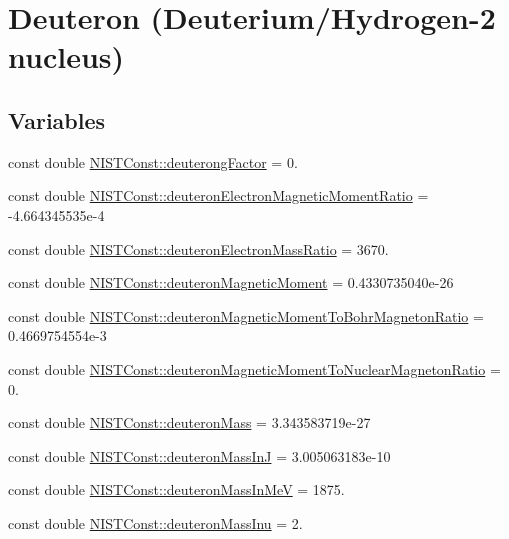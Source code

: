 \hypertarget{group___deuteron}{}\section{Deuteron (Deuterium/\+Hydrogen-\/2 nucleus)}
\label{group___deuteron}
\subsection*{Variables}
\begin{DoxyCompactItemize}
\item 
const double \hyperlink{group___deuteron_ga975b6e46b7ceaa0780c4b066a52444b7}{N\+I\+S\+T\+Const\+::deuterong\+Factor} = 0.
\item 
const double \hyperlink{group___deuteron_gaa01fffefa3ab64430fabf08808572689}{N\+I\+S\+T\+Const\+::deuteron\+Electron\+Magnetic\+Moment\+Ratio} = -\/4.\+664345535e-\/4
\item 
const double \hyperlink{group___deuteron_gaf25b1cce3ab8e1ec7f4f7790ea06ad0b}{N\+I\+S\+T\+Const\+::deuteron\+Electron\+Mass\+Ratio} = 3670.
\item 
const double \hyperlink{group___deuteron_gac8f7404645a2f994d9b1eda283e441d5}{N\+I\+S\+T\+Const\+::deuteron\+Magnetic\+Moment} = 0.\+4330735040e-\/26
\item 
const double \hyperlink{group___deuteron_ga6eb7ee28bf12ef4d2e7acf59d29f6450}{N\+I\+S\+T\+Const\+::deuteron\+Magnetic\+Moment\+To\+Bohr\+Magneton\+Ratio} = 0.\+4669754554e-\/3
\item 
const double \hyperlink{group___deuteron_ga686e76e6696a7312486f6e39e4583d0b}{N\+I\+S\+T\+Const\+::deuteron\+Magnetic\+Moment\+To\+Nuclear\+Magneton\+Ratio} = 0.
\item 
const double \hyperlink{group___deuteron_ga6795eea7d04fa12d83ce437e2e07e2a8}{N\+I\+S\+T\+Const\+::deuteron\+Mass} = 3.\+343583719e-\/27
\item 
const double \hyperlink{group___deuteron_ga3c0469eef4b87fe014d7988939b97270}{N\+I\+S\+T\+Const\+::deuteron\+Mass\+InJ} = 3.\+005063183e-\/10
\item 
const double \hyperlink{group___deuteron_gad8bdb9aec5ffd7e583bc492c500106e4}{N\+I\+S\+T\+Const\+::deuteron\+Mass\+In\+MeV} = 1875.
\item 
const double \hyperlink{group___deuteron_ga65b03219bebd7561b1dae8f084c3d090}{N\+I\+S\+T\+Const\+::deuteron\+Mass\+Inu} = 2.
\item 

\end{DoxyCompactItemize}
